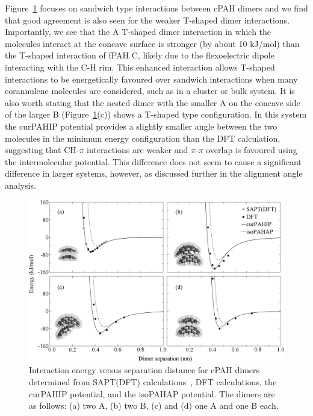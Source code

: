 Figure~\ref{fig:potentialDFTcurves} focuses on sandwich type interactions between cPAH dimers and we find that good agreement is also seen for the weaker T-shaped dimer interactions. Importantly, we see that the A T-shaped dimer interaction in which the molecules interact at the concave surface is stronger (by about 10 kJ/mol) than the T-shaped interaction of fPAH C, likely due to the flexoelectric dipole interacting with the C-H rim.  This enhanced interaction allows T-shaped interactions to be energetically favoured over sandwich interactions when many corannulene molecules are considered, such as in a cluster or bulk system.  %
It is also worth stating that the nested dimer with the smaller A on the concave side of the larger B (Figure~\ref{fig:potentialDFTcurves}(c)) shows a T-shaped type configuration. In this system the curPAHIP potential provides a slightly smaller angle between the two molecules in the minimum energy configuration than the DFT calculation, suggesting that CH-$\pi$ interactions are weaker and $\pi$-$\pi$ overlap is favoured using the intermolecular potential.  This difference does not seem to cause a significant difference in larger systems, however, as discussed further in the alignment angle analysis. 
%
\begin{figure}[!tbh]
\centering
\includegraphics[width=1\linewidth]{Figures/potentialDFT_curves.eps}
\caption{Interaction energy versus separation distance for cPAH dimers determined from SAPT(DFT) calculations~\cite{Cabaleiro-Lago2018}, DFT calculations, the curPAHIP potential, and the isoPAHAP potential. The dimers are as follows: (a) two A, (b) two B, (c) and (d) one A and one B each.}
\label{fig:potentialDFTcurves}
\end{figure}
%

